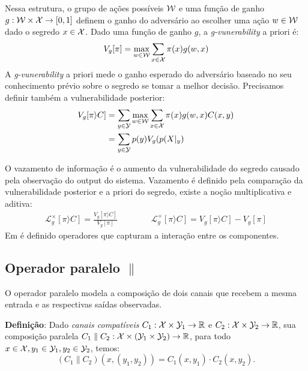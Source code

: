 Nessa estrutura, o grupo de ações possíveis $\mathcal{W}$ e uma função de ganho $g:\mathcal{W} \times \mathcal{X} \rightarrow [0,1]$ definem o ganho do adversário ao escolher uma ação $w\in\mathcal{W}$ dado o segredo $x\in\mathcal{X}$. Dado uma função de ganho $g$, a \emph{g-vunerability} a priori é:
$$ V_g[\pi] = \max_{w\in\mathcal{W}} \sum_{x\in\mathcal{X}} \pi(x)g(w,x) $$
A \emph{g-vunerability} a priori mede o ganho esperado do adversário baseado no seu conhecimento prévio sobre o segredo se tomar a melhor decisão. Precisamos definir também a vulnerabilidade posterior:
\begin{align*}
V_g[\pi\rangle C]  & = \sum_{y\in\mathcal{Y}} \max_{w\in\mathcal{W}} \sum_{x\in\mathcal{X}} \pi(x)g(w,x)C(x,y) \\
& = \sum_{y\in\mathcal{Y}} p(y) V_g(p(X|_y)
\end{align*}

O vazamento de informação é o aumento da vulnerabilidade do segredo causado pela observação do output do sistema. 
Vazamento é definido pela comparação da vulnerabilidade posterior e a priori do segredo, existe a noção multiplicativa e aditiva\cite{Alvim:14:CSF}:
\begin{align*}
\mathcal{L}^{\times}_{g}[\pi\rangle C] = \frac{V_g[\pi\rangle C]}{V_g[\pi]}&\hspace{1cm}&\mathcal{L}^{+}_{g}[\pi\rangle C] = {V_g[\pi\rangle C]} - {V_g[\pi]}
\end{align*}
Em\cite{Americo} é definido operadores que capturam a interação entre os componentes. 
\subsection*{Operador paralelo $\parallel$}  
O operador paralelo modela a composição de dois canais que recebem a mesma entrada e as respectivas saídas observadas. 

\textbf{Definição}: Dado \emph{canais compatíveis} $C_1:\mathcal{X}\times\mathcal{Y}_1 \rightarrow \mathbb{R}$ e $C_2:\mathcal{X}\times\mathcal{Y}_2 \rightarrow \mathbb{R}$, sua composição paralela $C_1 \parallel C_2 : \mathcal{X}\times(\mathcal{Y}_1\times\mathcal{Y}_2) \rightarrow \mathbb{R}$, para todo $x\in\mathcal{X}, y_1\in\mathcal{Y}_1, y_2\in\mathcal{Y}_2$, temos: $$(C_1 \parallel C_2)(x,(y_1,y_2)) = C_1(x,y_1) \cdot C_2(x,y_2).$$
